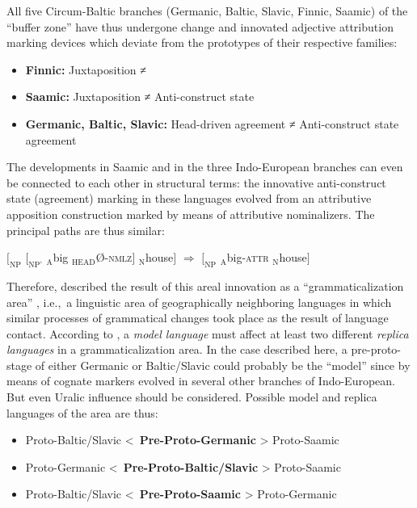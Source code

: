 All five Circum-Baltic branches (Germanic, Baltic, Slavic, Finnic, Saamic) of the “buffer zone” have thus undergone change and innovated adjective attribution marking devices which deviate from the prototypes of their respective families:
\begin{itemize}
\item	\textbf{Finnic:}
\subitem Juxtaposition ≠ 
\item	\textbf{Saamic:}
\subitem Juxtaposition ≠ Anti\hyp{}construct state
\item	\textbf{Germanic, Baltic, Slavic:}
\subitem Head\hyp{}driven agreement ≠ Anti\hyp{}construct state agreement
\end{itemize}
The developments in Saamic and in the three Indo-European branches can even be connected to each other in structural terms: the innovative anti\hyp{}construct state (agreement) marking in these languages evolved from an attributive apposition construction marked by means of attributive nominalizers. The principal  paths are thus similar:
\begin{exe}
\ex $[_{\text{NP}}$ $[_{\text{NP'}}$ $_{\text{A}}$big $_{\text{HEAD}}$Ø-\textsc{nmlz}$]$ $_{\text{N}}$house$]$ $\Rightarrow$ $[_{\text{NP}}$ $_{\text{A}}$big-\textsc{attr} $_{\text{N}}$house$]$
\end{exe}
Therefore, \citet[271]{riesler2006a} described the result of this areal innovation as a “grammaticalization area” \citep{heine-etal2005}, i.e.,~a linguistic area of geographically neighboring languages in which similar processes of grammatical changes took place as the result of language contact. According to \citet{heine-etal2005}, a \textit{model language} must affect at least two different \textit{replica languages} in a grammaticalization area. In the case described here, a pre-proto-stage of either Germanic or Baltic\slash{}Slavic could probably be the “model” since  by means of cognate markers evolved in several other branches of Indo-European. But even Uralic influence should be considered. Possible model and replica languages of the area are thus:
\begin{itemize}
\item	\begin{center}Proto\hyp{}Baltic\slash{}Slavic <~\textbf{Pre-Proto\hyp{}Germanic} > Proto\hyp{}Saamic\end{center}
\item	\begin{center}Proto\hyp{}Germanic <~\textbf{Pre-Proto\hyp{}Baltic\slash{}Slavic} > Proto\hyp{}Saamic\end{center}
\item \begin{center}Proto\hyp{}Baltic\slash{}Slavic <~\textbf{Pre-Proto\hyp{}Saamic} > Proto\hyp{}Germanic\end{center}
\end{itemize}
